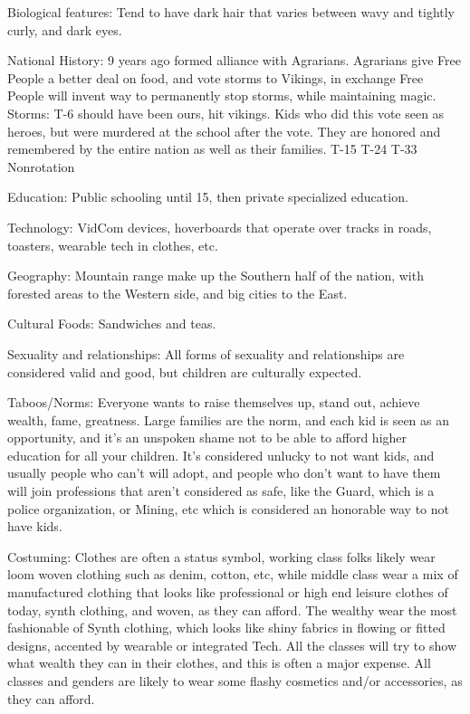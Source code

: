 \documentclass[blue]{GL2020}
\begin{document}
	
Biological features:	Tend to have dark hair that varies between wavy and tightly curly, and dark eyes.

National History:		9 years ago formed alliance with Agrarians.  Agrarians give Free People a better deal on food, and vote storms to Vikings, in exchange Free People will invent way to permanently stop storms, while maintaining magic.  %
	Storms:		T-6 should have been ours, hit vikings.  Kids who did this vote seen as heroes, but were murdered at the school after the vote.  They are honored and remembered by the entire nation as well as their families. %
						T-15
						T-24
						T-33
						Nonrotation
	
Education:	Public schooling until 15, then private specialized education.

Technology:		VidCom devices, hoverboards that operate over tracks in roads, toasters, wearable tech in clothes, etc.  

Geography:	Mountain range make up the Southern half of the nation, with forested areas to the Western side, and big cities to the East.

Cultural Foods:	Sandwiches and teas.

Sexuality and relationships:	All forms of sexuality and relationships are considered valid and good, but children are culturally expected.

Taboos/Norms:		Everyone wants to raise themselves up, stand out, achieve wealth, fame, greatness.  Large families are the norm, and each kid is seen as an opportunity, and it's an unspoken shame not to be able to afford higher education for all your children.  It's considered unlucky to not want kids, and usually people who can't will adopt, and people who don't want to have them will join professions that aren't considered as safe, like the Guard, which is a police organization, or Mining, etc which is considered an honorable way to not have kids.

Costuming:		Clothes are often a status symbol, working class folks likely wear loom woven clothing such as denim, cotton, etc, while middle class wear a mix of manufactured clothing that looks like professional or high end leisure clothes of today, synth clothing, and woven, as they can afford.  The wealthy wear the most fashionable of Synth clothing, which looks like shiny fabrics in flowing or fitted designs, accented by wearable or integrated Tech.  All the classes will try to show what wealth they can in their clothes, and this is often a major expense.  All classes and genders are likely to wear some flashy cosmetics and/or accessories, as they can afford.
\end{document}
